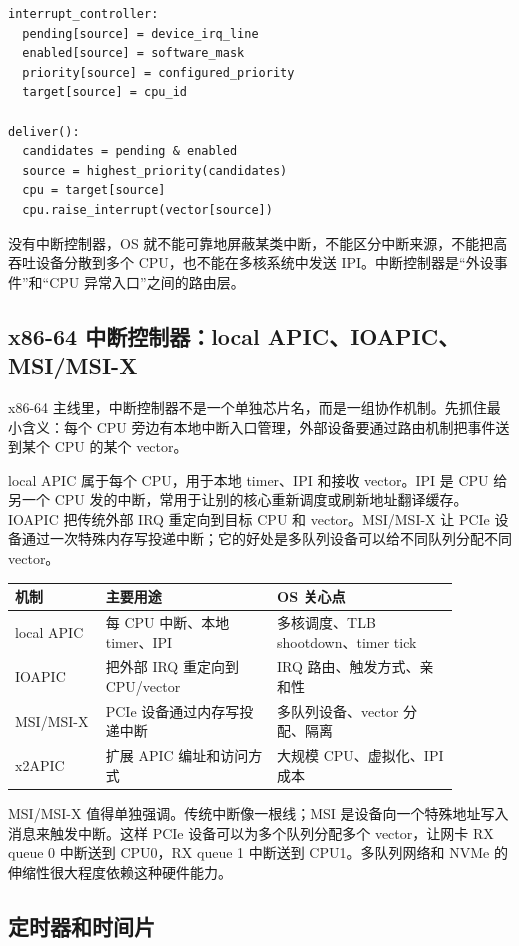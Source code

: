\begin{lstlisting}
interrupt_controller:
  pending[source] = device_irq_line
  enabled[source] = software_mask
  priority[source] = configured_priority
  target[source] = cpu_id

deliver():
  candidates = pending & enabled
  source = highest_priority(candidates)
  cpu = target[source]
  cpu.raise_interrupt(vector[source])
\end{lstlisting}

没有中断控制器，OS 就不能可靠地屏蔽某类中断，不能区分中断来源，不能把高吞吐设备分散到多个 CPU，也不能在多核系统中发送 IPI。中断控制器是“外设事件”和“CPU 异常入口”之间的路由层。

\subsection{x86-64 中断控制器：local APIC、IOAPIC、MSI/MSI-X}

x86-64 主线里，中断控制器不是一个单独芯片名，而是一组协作机制。先抓住最小含义：每个 CPU 旁边有本地中断入口管理，外部设备要通过路由机制把事件送到某个 CPU 的某个 vector。

local APIC 属于每个 CPU，用于本地 timer、IPI 和接收 vector。IPI 是 CPU 给另一个 CPU 发的中断，常用于让别的核心重新调度或刷新地址翻译缓存。IOAPIC 把传统外部 IRQ 重定向到目标 CPU 和 vector。MSI/MSI-X 让 PCIe 设备通过一次特殊内存写投递中断；它的好处是多队列设备可以给不同队列分配不同 vector。

\begin{longtable}{p{0.18\linewidth}p{0.34\linewidth}p{0.36\linewidth}}
\toprule
机制 & 主要用途 & OS 关心点 \\
\midrule
local APIC & 每 CPU 中断、本地 timer、IPI & 多核调度、TLB shootdown、timer tick \\
IOAPIC & 把外部 IRQ 重定向到 CPU/vector & IRQ 路由、触发方式、亲和性 \\
MSI/MSI-X & PCIe 设备通过内存写投递中断 & 多队列设备、vector 分配、隔离 \\
x2APIC & 扩展 APIC 编址和访问方式 & 大规模 CPU、虚拟化、IPI 成本 \\
\bottomrule
\end{longtable}

MSI/MSI-X 值得单独强调。传统中断像一根线；MSI 是设备向一个特殊地址写入消息来触发中断。这样 PCIe 设备可以为多个队列分配多个 vector，让网卡 RX queue 0 中断送到 CPU0，RX queue 1 中断送到 CPU1。多队列网络和 NVMe 的伸缩性很大程度依赖这种硬件能力。

\subsection{定时器和时间片}

